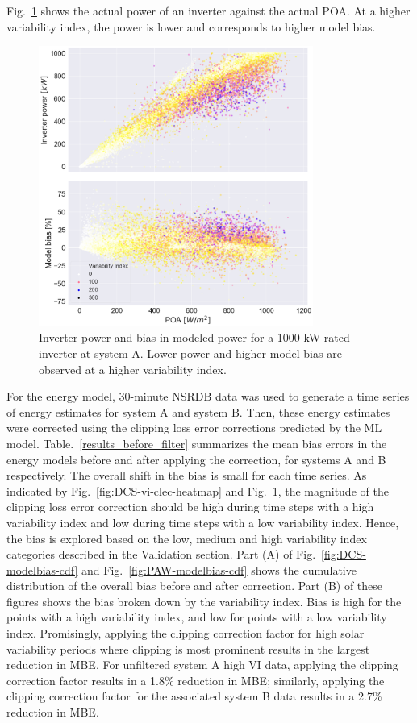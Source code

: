 \documentclass[conference]{IEEEtran}
\begin{document}
Fig.~\ref{fig:DCS-inv-modelbias-poa-scatter} shows the actual power of an inverter against the actual POA. At a higher variability index, the power is lower and corresponds to higher model bias.

\begin{figure}[htbp]
\centerline{\includegraphics[width=9cm]{DCS_Inv_ModelBias_POA_with_VI.png}}
\caption{Inverter power and bias in modeled power for a 1000 kW rated inverter at system A. Lower power and higher model bias are observed at a higher variability index.}
\label{fig:DCS-inv-modelbias-poa-scatter}
\end{figure}

For the energy model, 30-minute NSRDB data was used to generate a time series of energy estimates for system A and system B. Then, these energy estimates were corrected using the clipping loss error corrections predicted by the ML model. Table.~\ref{results_before_filter} summarizes the mean bias errors in the energy models before and after applying the correction, for systems A and B respectively. The overall shift in the bias is small for each time series. As indicated by Fig.~\ref{fig:DCS-vi-clec-heatmap} and Fig.~\ref{fig:DCS-inv-modelbias-poa-scatter}, the magnitude of the clipping loss error correction should be high during time steps with a high variability index and low during time steps with a low variability index. Hence, the bias is explored based on the low, medium and high variability index categories described in the Validation section. Part (A) of Fig.~\ref{fig:DCS-modelbias-cdf} and Fig.~\ref{fig:PAW-modelbias-cdf} shows the cumulative distribution of the overall bias before and after correction. Part (B) of these figures shows the bias broken down by the variability index. Bias is high for the points with a high variability index, and low for points with a low variability index.  Promisingly, applying the clipping correction factor for high solar variability periods where clipping is most prominent results in the largest reduction in MBE. For unfiltered system A high VI data, applying the clipping correction factor results in a 1.8\% reduction in MBE; similarly, applying the clipping correction factor for the associated system B data results in a 2.7\% reduction in MBE.
\end{document}
